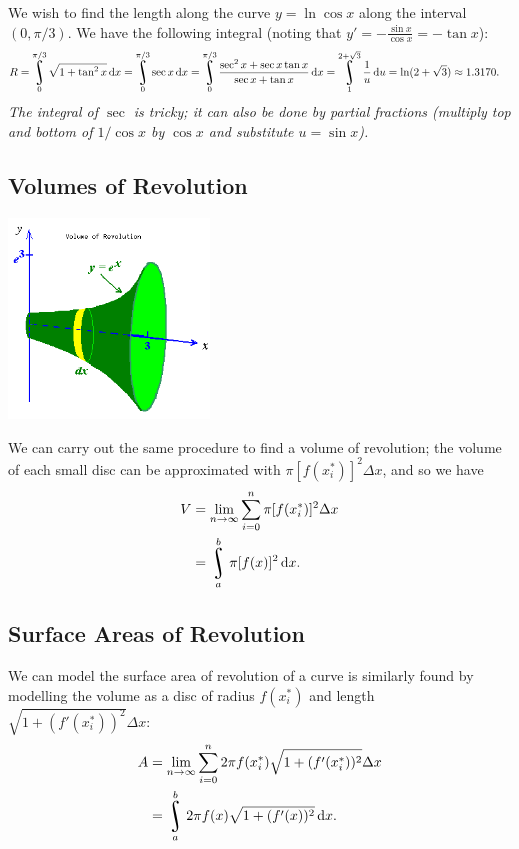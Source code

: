 \begin{ex}
  We wish to find the length along the curve $ y = \ln \cos x $ along the interval $ (0, \pi/3) $. We have the
  following integral (noting that $ y' = -\frac{\sin x}{\cos x} = -\tan x $):
  \begin{align*}
    R = \rint^{\pi/3}_0 \sqrt{1 + \tan^2 x} \dif{x} &= \rint^{\pi/3}_0 \sec x \dif{x}
                                                     = \rint^{\pi/3}_0 \frac{\sec^2 x + \sec x \tan x}{\sec x + \tan x} \dif{x}
                                                    = \rint^{2 + \sqrt{3}}_{1} \frac{1}{u} \dif{u}
                                                     =  \ln(2 + \sqrt{3}) \approx 1.3170.
  \end{align*}
  \textit{The integral of $ \sec $ is tricky; it can also be done by partial fractions (multiply top and bottom of $ 1/\cos x $
          by $ \cos x $ and substitute $ u = \sin x $).}
\end{ex}

\subsection*{Volumes of Revolution}
\begin{center}
  \includegraphics[width=0.4\textwidth]{revs}
\end{center}
We can carry out the same procedure to find a volume of revolution; the volume of each small disc can be approximated
with $ \pi [f(x_i^\ast)]^2 \Delta x $, and so we have
\begin{align*}
  V &= \lim_{n \to \infty} \sum_{i=0}^n \pi [f(x_i^\ast)]^2 \Delta x\\
    &= \rint_a^b \pi [f(x)]^2 \dif{x}.
\end{align*}

\subsection*{Surface Areas of Revolution}
We can model the surface area of revolution of a curve is similarly found by modelling the volume as a disc of
radius $ f(x_i^\ast) $ and length $ \sqrt{1 + (f'(x_i^\ast))^2} \Delta x $:
\begin{align*}
  A &= \lim_{n \to \infty} \sum_{i=0}^n 2\pi f(x_i^\ast) \sqrt{1 + (f'(x_i^\ast))^2} \Delta x\\
    &= \rint_a^b 2\pi f(x) \sqrt{1 + (f'(x))^2} \dif{x}.
\end{align*}


